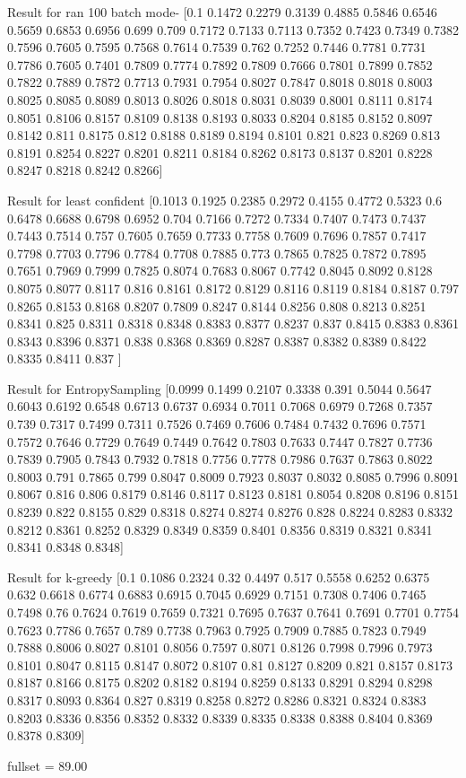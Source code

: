 Result for ran 100 batch mode-
[0.1    0.1472 0.2279 0.3139 0.4885 0.5846 0.6546 0.5659 0.6853 0.6956
 0.699  0.709  0.7172 0.7133 0.7113 0.7352 0.7423 0.7349 0.7382 0.7596
 0.7605 0.7595 0.7568 0.7614 0.7539 0.762  0.7252 0.7446 0.7781 0.7731
 0.7786 0.7605 0.7401 0.7809 0.7774 0.7892 0.7809 0.7666 0.7801 0.7899
 0.7852 0.7822 0.7889 0.7872 0.7713 0.7931 0.7954 0.8027 0.7847 0.8018
 0.8018 0.8003 0.8025 0.8085 0.8089 0.8013 0.8026 0.8018 0.8031 0.8039
 0.8001 0.8111 0.8174 0.8051 0.8106 0.8157 0.8109 0.8138 0.8193 0.8033
 0.8204 0.8185 0.8152 0.8097 0.8142 0.811  0.8175 0.812  0.8188 0.8189
 0.8194 0.8101 0.821  0.823  0.8269 0.813  0.8191 0.8254 0.8227 0.8201
 0.8211 0.8184 0.8262 0.8173 0.8137 0.8201 0.8228 0.8247 0.8218 0.8242
 0.8266]

Result for least confident 
[0.1013 0.1925 0.2385 0.2972 0.4155 0.4772 0.5323 0.6    0.6478 0.6688
 0.6798 0.6952 0.704  0.7166 0.7272 0.7334 0.7407 0.7473 0.7437 0.7443
 0.7514 0.757  0.7605 0.7659 0.7733 0.7758 0.7609 0.7696 0.7857 0.7417
 0.7798 0.7703 0.7796 0.7784 0.7708 0.7885 0.773  0.7865 0.7825 0.7872
 0.7895 0.7651 0.7969 0.7999 0.7825 0.8074 0.7683 0.8067 0.7742 0.8045
 0.8092 0.8128 0.8075 0.8077 0.8117 0.816  0.8161 0.8172 0.8129 0.8116
 0.8119 0.8184 0.8187 0.797  0.8265 0.8153 0.8168 0.8207 0.7809 0.8247
 0.8144 0.8256 0.808  0.8213 0.8251 0.8341 0.825  0.8311 0.8318 0.8348
 0.8383 0.8377 0.8237 0.837  0.8415 0.8383 0.8361 0.8343 0.8396 0.8371
 0.838  0.8368 0.8369 0.8287 0.8387 0.8382 0.8389 0.8422 0.8335 0.8411
 0.837 ]

Result for EntropySampling
[0.0999 0.1499 0.2107 0.3338 0.391  0.5044 0.5647 0.6043 0.6192 0.6548
 0.6713 0.6737 0.6934 0.7011 0.7068 0.6979 0.7268 0.7357 0.739  0.7317
 0.7499 0.7311 0.7526 0.7469 0.7606 0.7484 0.7432 0.7696 0.7571 0.7572
 0.7646 0.7729 0.7649 0.7449 0.7642 0.7803 0.7633 0.7447 0.7827 0.7736
 0.7839 0.7905 0.7843 0.7932 0.7818 0.7756 0.7778 0.7986 0.7637 0.7863
 0.8022 0.8003 0.791  0.7865 0.799  0.8047 0.8009 0.7923 0.8037 0.8032
 0.8085 0.7996 0.8091 0.8067 0.816  0.806  0.8179 0.8146 0.8117 0.8123
 0.8181 0.8054 0.8208 0.8196 0.8151 0.8239 0.822  0.8155 0.829  0.8318
 0.8274 0.8274 0.8276 0.828  0.8224 0.8283 0.8332 0.8212 0.8361 0.8252
 0.8329 0.8349 0.8359 0.8401 0.8356 0.8319 0.8321 0.8341 0.8341 0.8348
 0.8348]

 Result for k-greedy
[0.1    0.1086 0.2324 0.32   0.4497 0.517  0.5558 0.6252 0.6375 0.632
 0.6618 0.6774 0.6883 0.6915 0.7045 0.6929 0.7151 0.7308 0.7406 0.7465
 0.7498 0.76   0.7624 0.7619 0.7659 0.7321 0.7695 0.7637 0.7641 0.7691
 0.7701 0.7754 0.7623 0.7786 0.7657 0.789  0.7738 0.7963 0.7925 0.7909
 0.7885 0.7823 0.7949 0.7888 0.8006 0.8027 0.8101 0.8056 0.7597 0.8071
 0.8126 0.7998 0.7996 0.7973 0.8101 0.8047 0.8115 0.8147 0.8072 0.8107
 0.81   0.8127 0.8209 0.821  0.8157 0.8173 0.8187 0.8166 0.8175 0.8202
 0.8182 0.8194 0.8259 0.8133 0.8291 0.8294 0.8298 0.8317 0.8093 0.8364
 0.827  0.8319 0.8258 0.8272 0.8286 0.8321 0.8324 0.8383 0.8203 0.8336
 0.8356 0.8352 0.8332 0.8339 0.8335 0.8338 0.8388 0.8404 0.8369 0.8378
 0.8309]
    
    
fullset =    89.00